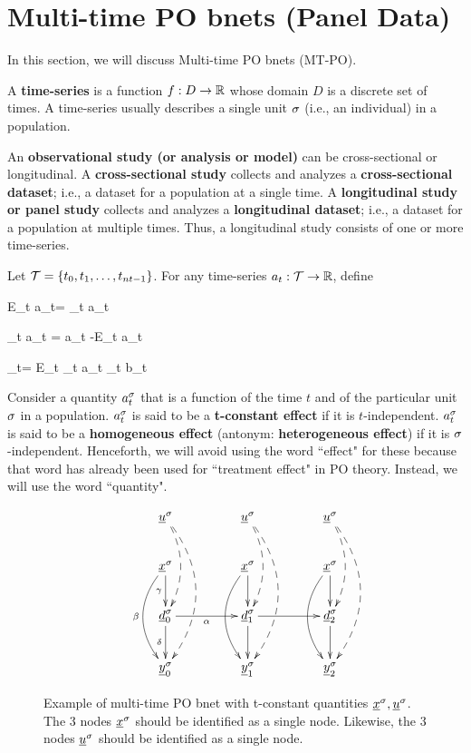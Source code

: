 \section{Multi-time PO bnets (Panel Data)}

In this section, we will
discuss Multi-time PO bnets (MT-PO).

A {\bf time-series} is a function $f:D\rightarrow { \mathbb{R}}$
whose domain $D$ is a discrete set
of times. A time-series 
usually describes a single
unit $\sigma$ (i.e., an individual)
in a population.

An {\bf observational study (or analysis or model)}
can be cross-sectional or longitudinal.
A {\bf cross-sectional study} 
collects and analyzes a {\bf cross-sectional dataset};
i.e., a dataset for a population
at a single time. A {\bf longitudinal study
or panel study} collects and analyzes 
a {\bf longitudinal dataset};
i.e., a dataset for a population
at  multiple times. 
Thus, a longitudinal study 
consists of one or more time-series.

Let ${\cal T}=\{t_0, t_1, \ldots, t_{nt-1}\}$.
For any time-series $a_t: {\cal T}\rightarrow{ \mathbb{R}}$,
define

\beq
E_t a_t=
\sum_{t\in \calt} a_t
\eeq

\beq
\Delta_t a_t = a_t -E_t a_t
\eeq

\beq
{}_t= E_t \Delta_t a_t \Delta_t b_t
\eeq

Consider a quantity $a^\sigma_t$
that is a function of  the time $t$
and of the particular unit $\sigma$
in a population.
$a^\sigma_t$ is said to be a
 {\bf t-constant effect} 
if it is $t$-independent.
$a^\sigma_t$ is said to be a
{\bf homogeneous effect}
(antonym: {\bf heterogeneous effect})
if it is
$\sigma$-independent.
Henceforth, we will avoid 
using the word ``effect" for these
because that word
 has already been used for 
``treatment effect" in
PO theory.
Instead, we will use the word ``quantity".

\begin{figure}[h!]
$$\xymatrix @C=4pc {
\rvu^\s\ar@/^1pc/@{-->}[dd]\ar@/^2pc/@{-->}[ddd]
&\rvu^\s\ar@/^1pc/@{-->}[dd]\ar@/^2pc/@{-->}[ddd]
&\rvu^\s\ar@/^1pc/@{-->}[dd]\ar@/^2pc/@{-->}[ddd]
\\
\rvx^\s\ar[d]_\gamma\ar@/_1.5pc/[dd]_\beta
&\rvx^\s\ar[d]\ar@/_1.5pc/[dd]
&\rvx^\s\ar[d]\ar@/_1.5pc/[dd]
\\
\rvd^\s_0\ar[d]_\delta\ar[r]_\alp
&\rvd^\s_1\ar[d]\ar[r]
&\rvd^\s_2\ar[d]
\\
\rvy^\s_0
&\rvy^\s_1
&\rvy^\s_2
}$$
\caption{Example 
of multi-time PO bnet
with t-constant quantities ${\underline{x}}^\sigma, {\underline{u}}^\sigma$.
The 
3 nodes ${\underline{x}}^\sigma$
should be identified
as a single node. 
 Likewise, the 
3 nodes ${\underline{u}}^\sigma$
should be identified
as a single node. 
}
\label{fig-dynamic-po}
\end{figure}

